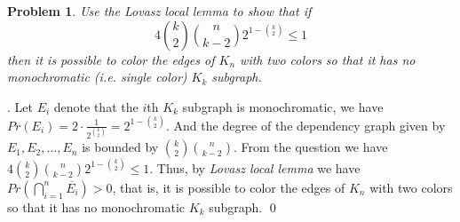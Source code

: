 \documentclass[12pt]{article}
\newtheorem{hw}{Problem}
\newenvironment{sol}
  {\par\vspace{3mm}\noindent{\it Solution}.}
  {\qed}
\begin{document}
\begin{hw}
Use the Lovasz local lemma to show that if \[4 {k \choose 2} {n \choose {k-2}}2^{1-{k\choose 2}}\leq 1\]
then it is possible to color the edges of $K_n$ with two colors so that it has no monochromatic (i.e. single color) $K_k$ subgraph.
\end{hw}
\begin{sol}
	Let $E_{i}$ denote that the $i$th $K_k$ subgraph is monochromatic, we have $Pr(E_i) = 2 \cdot \frac{1}{2^{{k \choose 2}}} = 2^{1-{k\choose 2}}$. And the degree of the dependency graph given by $E_1, E_2, \dots, E_n$ is bounded by ${k \choose 2} {n \choose {k-2}}$. From the question we have $4 {k \choose 2} {n \choose {k-2}}2^{1-{k\choose 2}}\leq 1$. Thus, by \emph{Lovasz local lemma} we have $Pr(\bigcap_{i = 1}^n \overline{E_i}) > 0$, that is, it is possible to color the edges of $K_n$ with two colors so that it has no monochromatic $K_k$ subgraph.
\end{sol}
\end{document}

